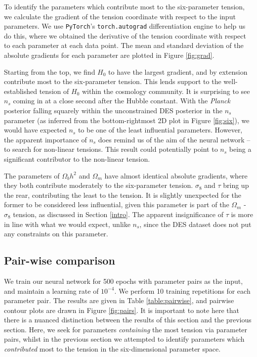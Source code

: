 \documentclass[%
 reprint,
 amsmath,amssymb,
 aps,
]{revtex4-2}
\begin{document}
To identify the parameters which contribute most to the six-parameter tension, we calculate the gradient of the tension coordinate with respect to the input parameters. We use \texttt{PyTorch}'s \texttt{torch.autograd} differentiation engine to help us do this, where we obtained the derivative of the tension coordinate with respect to each parameter at each data point. The mean and standard deviation of the absolute gradients for each parameter are plotted in Figure \ref{fig:grad}.

Starting from the top, we find $H_0$ to have the largest gradient, and by extension contribute most to the six-parameter tension. This lends support to the well-established tension of $H_0$ within the cosmology community. It is surprising to see $n_s$ coming in at a close second after the Hubble constant. With the \textit{Planck} posterior falling squarely within the unconstrained DES posterior in the $n_s$ parameter (as inferred from the bottom-rightmost 2D plot in Figure \ref{fig:six}), we would have expected $n_s$ to be one of the least influential parameters. However, the apparent importance of $n_s$ does remind us of the aim of the neural network -- to search for non-linear tensions. This result could potentially point to $n_s$ being a significant contributor to the non-linear tension. 

The parameters of $\Omega_b h^2$ and $\Omega_m$ have almost identical absolute gradients, where they both contribute moderately to the six-parameter tension. $\sigma_8$ and $\tau$ bring up the rear, contributing the least to the tension. It is slightly unexpected for the former to be considered less influential, given this parameter is part of the $\Omega_m$ - $\sigma_8$ tension, as discussed in Section \ref{intro}. The apparent insignificance of $\tau$ is more in line with what we would expect, unlike $n_s$, since the DES dataset does not put any constraints on this parameter.


\subsection{Pair-wise comparison} \label{section:pair}

We train our neural network for 500 epochs with parameter pairs as the input, and maintain a learning rate of $10^{-4}$. We perform 10 training repetitions for each parameter pair. The results are given in Table \ref{table:pairwise}, and pairwise contour plots are drawn in Figure \ref{fig:pairs}. It is important to note here that there is a nuanced distinction between the results of this section and the previous section. Here, we seek for parameters \textit{containing} the most tension via parameter pairs, whilst in the previous section we attempted to identify parameters which \textit{contributed} most to the tension in the six-dimensional parameter space.
\end{document}

